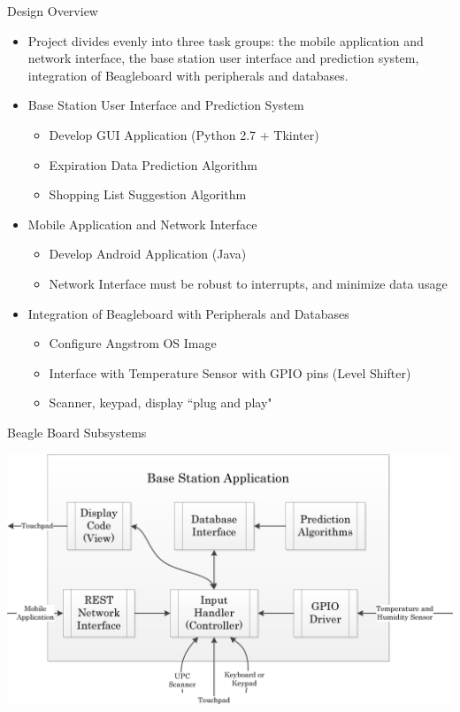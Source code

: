 \documentclass[t]{beamer}
\begin{document}
\begin{frame}{Design Overview}
\begin{itemize}
\item Project divides evenly into three task groups: the mobile application and network interface, the base station user interface and prediction system, integration of Beagleboard with peripherals and databases.
\item Base Station User Interface and Prediction System
\begin{itemize}
\item Develop GUI Application (Python 2.7 + Tkinter)
\item Expiration Data Prediction Algorithm
\item Shopping List Suggestion Algorithm
\end{itemize}
\item Mobile Application and Network Interface
\begin{itemize}
\item Develop Android Application (Java)
\item Network Interface must be robust to interrupts, and minimize data usage
\end{itemize}
\item Integration of Beagleboard with Peripherals and Databases
\begin{itemize}
\item Configure Angstrom OS Image
\item Interface with Temperature Sensor with GPIO pins (Level Shifter)
\item Scanner, keypad, display ``plug and play"
\end{itemize}
\end{itemize}
\end{frame}

\begin{frame}{Beagle Board Subsystems}
\begin{center}
\includegraphics[scale=0.65]{../Graphics/BaseStation}
\end{center}
\end{frame}
\end{document}
